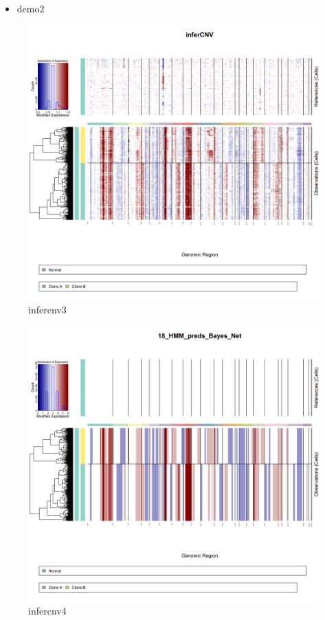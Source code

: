 \documentclass[
]{book}
\providecommand{\tightlist}{%
  \setlength{\itemsep}{0pt}\setlength{\parskip}{0pt}}
\begin{document}
\begin{itemize}
\tightlist
\item
  demo2
\end{itemize}

\begin{figure}
\centering
\includegraphics{./CNV_analysis_file/figs/tnbc1_demo2/infercnv.png}
\caption{infercnv3}
\end{figure}

\begin{figure}
\centering
\includegraphics{./CNV_analysis_file/figs/tnbc1_demo2/infercnv.18_HMM_pred.Bayes_Net.Pnorm_0.5.png}
\caption{infercnv4}
\end{figure}
\end{document}
